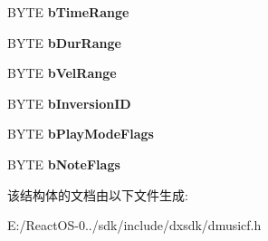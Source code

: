 \begin{DoxyCompactItemize}
B\+Y\+TE {\bfseries b\+Time\+Range}
\item 
\mbox{\label{struct___d_m_u_s___i_o___s_t_y_l_e_n_o_t_e_abb2a11af8ebeb5a473d0b38bd0c5d406}} 
B\+Y\+TE {\bfseries b\+Dur\+Range}
\item 
\mbox{\label{struct___d_m_u_s___i_o___s_t_y_l_e_n_o_t_e_a68313547531245c270a8908bdb7e0b7b}} 
B\+Y\+TE {\bfseries b\+Vel\+Range}
\item 
\mbox{\label{struct___d_m_u_s___i_o___s_t_y_l_e_n_o_t_e_a0a9f417bf6aed6e04ab514571d496861}} 
B\+Y\+TE {\bfseries b\+Inversion\+ID}
\item 
\mbox{\label{struct___d_m_u_s___i_o___s_t_y_l_e_n_o_t_e_a13500c3105ae5998d01842fd6d9a6ad9}} 
B\+Y\+TE {\bfseries b\+Play\+Mode\+Flags}
\item 
\mbox{\label{struct___d_m_u_s___i_o___s_t_y_l_e_n_o_t_e_aa8a974be0ed228ba2b065f5f9e6256d7}} 
B\+Y\+TE {\bfseries b\+Note\+Flags}
\end{DoxyCompactItemize}


该结构体的文档由以下文件生成\+:\begin{DoxyCompactItemize}
\item 
E\+:/\+React\+O\+S-\/0../sdk/include/dxsdk/dmusicf.\+h\end{DoxyCompactItemize}
